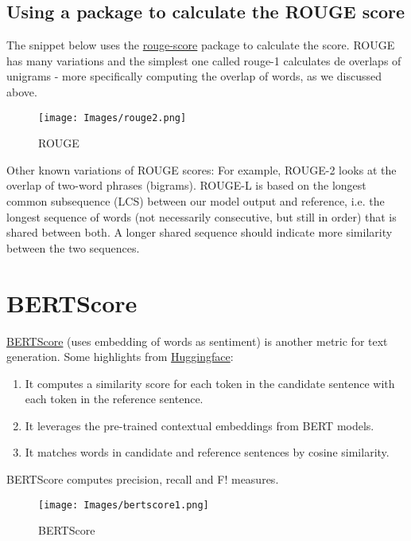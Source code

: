 {\subsection{ Using a package to calculate the ROUGE score}
\noindent The snippet below uses the \href{https://pypi.org/project/rouge-score/}{{\selectfont rouge-score}} package to calculate the score. ROUGE has many variations and the simplest one called rouge-1 calculates de overlaps of unigrams - more specifically computing the overlap of words, as we discussed above.\\

\begin{figure}[h]
    \centering
    \texttt{[image: Images/rouge2.png]}
    \caption{ROUGE}
    \label{fig:rouge2}
\end{figure}

\noindent Other known variations of ROUGE scores: For example, ROUGE-2 looks at the overlap of two-word phrases (bigrams). ROUGE-L is based on the longest common subsequence (LCS) between our model output and reference, i.e. the longest sequence of words (not necessarily consecutive, but still in order) that is shared between both. A longer shared sequence should indicate more similarity between the two sequences.\\

\section{BERTScore}
\href{https://github.com/Tiiiger/bert_score}{BERTScore} (uses embedding of words as sentiment) is another metric for text generation. Some highlights from \href{https://huggingface.co/spaces/evaluate-metric/bertscore}{Huggingface}:
\begin{enumerate}
    \item It computes a similarity score for each token in the candidate sentence with each token in the reference sentence.
    \item It leverages the pre-trained contextual embeddings from BERT models.
    \item It matches words in candidate and reference sentences by cosine similarity.
\end{enumerate}
\noindent BERTScore computes precision, recall and F! measures.
\begin{figure}[h]
    \centering
    \texttt{[image: Images/bertscore1.png]}
    \caption{BERTScore}
    \label{fig:bertscore1}
\end{figure}

}
